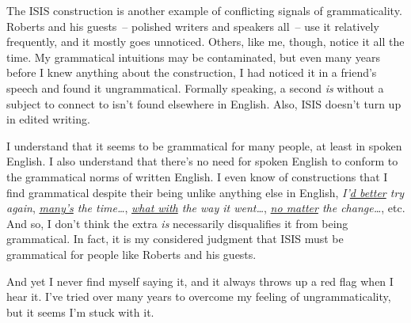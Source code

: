 \bigskip

The ISIS construction is another example of conflicting signals of grammaticality. Roberts and his guests~-- polished writers and speakers all~-- use it relatively frequently, and it mostly goes unnoticed. Others, like me, though, notice it all the time. My grammatical intuitions may be contaminated, but even many years before I knew anything about the construction, I had noticed it in a friend's speech and found it ungrammatical. Formally speaking, a second \textit{is} without a subject to connect to isn't found elsewhere in English. Also, ISIS doesn't turn up in edited writing.

I understand that it seems to be grammatical for many people, at least in spoken English. I also understand that there's no need for spoken English to conform to the grammatical norms of written English. I even know of constructions that I find grammatical despite their being unlike anything else in English, \textit{I'\uline{d better} try again}, \textit{\uline{many's} the time\dots}, \textit{\uline{what with} the way it went\dots}, \textit{\uline{no matter} the change\dots}, etc. And so, I don't think the extra \textit{is} necessarily disqualifies it from being grammatical. In fact, it is my considered judgment that ISIS must be grammatical for people like Roberts and his guests.

And yet I never find myself saying it, and it always throws up a red flag when I hear it. I've tried over many years to overcome my feeling of ungrammaticality, but it seems I'm stuck with it.





